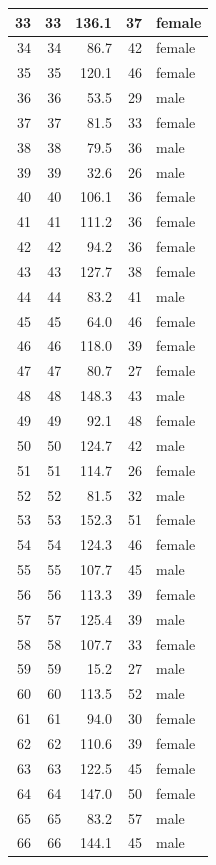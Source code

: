 \documentclass[]{svmono}
\begin{document}
\begin{tabular}{r|r|r|r|l}
\hline
33 & 33 & 136.1 & 37 & female\\
\hline
34 & 34 & 86.7 & 42 & female\\
\hline
35 & 35 & 120.1 & 46 & female\\
\hline
36 & 36 & 53.5 & 29 & male\\
\hline
37 & 37 & 81.5 & 33 & female\\
\hline
38 & 38 & 79.5 & 36 & male\\
\hline
39 & 39 & 32.6 & 26 & male\\
\hline
40 & 40 & 106.1 & 36 & female\\
\hline
41 & 41 & 111.2 & 36 & female\\
\hline
42 & 42 & 94.2 & 36 & female\\
\hline
43 & 43 & 127.7 & 38 & female\\
\hline
44 & 44 & 83.2 & 41 & male\\
\hline
45 & 45 & 64.0 & 46 & female\\
\hline
46 & 46 & 118.0 & 39 & female\\
\hline
47 & 47 & 80.7 & 27 & female\\
\hline
48 & 48 & 148.3 & 43 & male\\
\hline
49 & 49 & 92.1 & 48 & female\\
\hline
50 & 50 & 124.7 & 42 & male\\
\hline
51 & 51 & 114.7 & 26 & female\\
\hline
52 & 52 & 81.5 & 32 & male\\
\hline
53 & 53 & 152.3 & 51 & female\\
\hline
54 & 54 & 124.3 & 46 & female\\
\hline
55 & 55 & 107.7 & 45 & male\\
\hline
56 & 56 & 113.3 & 39 & female\\
\hline
57 & 57 & 125.4 & 39 & male\\
\hline
58 & 58 & 107.7 & 33 & female\\
\hline
59 & 59 & 15.2 & 27 & male\\
\hline
60 & 60 & 113.5 & 52 & male\\
\hline
61 & 61 & 94.0 & 30 & female\\
\hline
62 & 62 & 110.6 & 39 & female\\
\hline
63 & 63 & 122.5 & 45 & female\\
\hline
64 & 64 & 147.0 & 50 & female\\
\hline
65 & 65 & 83.2 & 57 & male\\
\hline
66 & 66 & 144.1 & 45 & male\\

\end{tabular}
\end{document}
